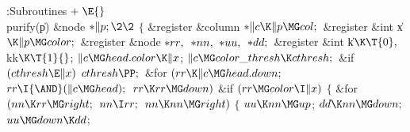\Y\B\4:Subroutines\X${}\mathrel+\E{}$\6
\\{purify}(\|p)\1\1\6
\&{node} ${}{*}\|p;\2\2{}$\6
${}\{{}$\5
\1\&{register} \&{column} ${}{*}\|c\K\|p\MG\\{col};{}$\6
\&{register} \&{int} \|x${}\K\|p\MG\\{color};{}$\6
\&{register} \&{node} ${}{*}\\{rr},{}$ ${}{*}\\{nn},{}$ ${}{*}\\{uu},{}$ ${}{*}%
\\{dd};{}$\6
\&{register} \&{int} \|k${}\K\T{0},{}$ \\{kk}${}\K\T{1}{}$;\7
${}\|c\MG\\{head}.\\{color}\K\|x{}$;\6
${}\|c\MG\\{color\_thresh}\K\\{cthresh};{}$\6
\&{if} ${}(\\{cthresh}\E\|x){}$\1\5
${}\\{cthresh}\PP;{}$\2\6
\&{for} ${}(\\{rr}\K\|c\MG\\{head}.\\{down};{}$ ${}\\{rr}\I{\AND}(\|c\MG%
\\{head});{}$ ${}\\{rr}\K\\{rr}\MG\\{down}){}$\1\6
\&{if} ${}(\\{rr}\MG\\{color}\I\|x){}$\5
${}\{{}$\1\6
\&{for} ${}(\\{nn}\K\\{rr}\MG\\{right};{}$ ${}\\{nn}\I\\{rr};{}$ ${}\\{nn}\K%
\\{nn}\MG\\{right}){}$\5
${}\{{}$\1\6
${}\\{uu}\K\\{nn}\MG\\{up}{}$;\5
${}\\{dd}\K\\{nn}\MG\\{down};{}$\6
${}\\{uu}\MG\\{down}\K\\{dd}{}$;\5
